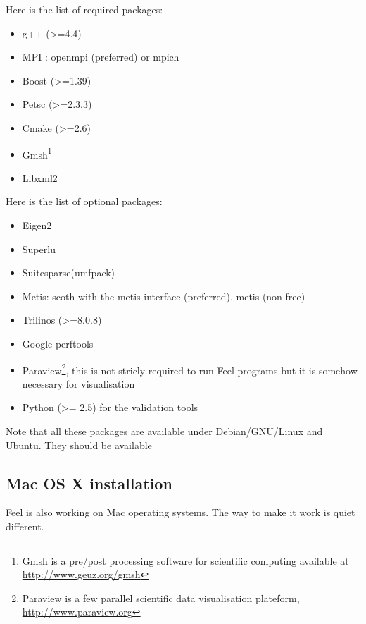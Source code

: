 \documentclass[a4paper]{book}
\newcommand{\feel}{Feel\xspace}
\begin{document}
Here is the list of required packages:
\begin{itemize}
\item g++ (>=4.4)
\item MPI : openmpi (preferred) or mpich
\item Boost (>=1.39)
\item Petsc (>=2.3.3)
\item Cmake (>=2.6)
\item Gmsh\footnote{Gmsh is a pre/post processing software for scientific
computing available at \url{http://www.geuz.org/gmsh}}
\item Libxml2
\end{itemize}

Here is the list of optional packages:
\begin{itemize}
\item Eigen2
\item Superlu
\item Suitesparse(umfpack)
\item Metis: scoth with the metis interface (preferred), metis (non-free)
\item Trilinos (>=8.0.8)
\item Google perftools
\item Paraview\footnote{Paraview is a few parallel scientific data
    visualisation plateform, \url{http://www.paraview.org}}, this is
  not stricly required to run \feel programs but it is somehow
  necessary for visualisation
\item Python (>= 2.5) for the validation tools
\end{itemize}

Note that all these packages are available under Debian/GNU/Linux and
Ubuntu. They should be available

\subsection{Mac OS X installation}
\feel is also working on Mac operating systems. The way to make it work is quiet different.
\end{document}

